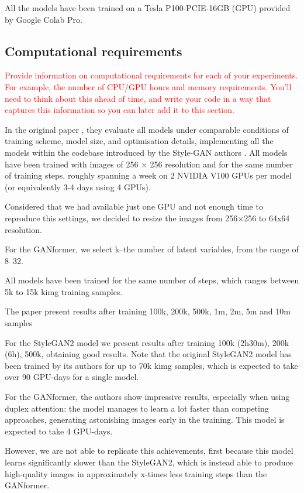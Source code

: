 \documentclass{article}
\begin{document}
	 All the models have been trained on a Tesla P100-PCIE-16GB (GPU) provided by Google 
	 Colab Pro.
	
	\subsection{Computational requirements}
	\textcolor{red}{Provide information on computational requirements for each of your experiments. For 
	example, the  number of CPU/GPU hours and memory requirements. You'll need to think about this 
	ahead of time, and write your code in a way that captures this information so you can later add it to 
	this section.}
	
	In the original paper \cite{hudson2021generative}, they evaluate all models under comparable 
	conditions of training scheme, model size, and optimisation details, implementing all the models 
	within the codebase introduced by the Style-GAN authors \cite{karras2020analyzing}. 
	All models have been trained with images of 256 × 256 resolution and for the 
	same number of training steps, roughly spanning a week on 2 NVIDIA V100 GPUs per model (or 
	equivalently 3-4 days using 4 GPUs). 
	
	Considered that we had available just one GPU and not enough time to reproduce this settings, we 
	decided to resize the images from 256×256 to 64x64 resolution.
	
	
	For the GANformer, we select k–the number of latent variables, from the range of 8–32. 
	
	All models have been trained for the same number of steps, which ranges between 5k to 15k kimg 
	training samples. 
	
	The paper present results after training 100k, 200k, 500k, 1m, 2m, 5m and 10m samples
	
	For the StyleGAN2 model we present results after training 100k (2h30m), 200k (6h), 500k, obtaining 
	good results.
	Note that the original StyleGAN2 model has been trained by its authors \cite{karras2020analyzing} 
	for up to 70k kimg samples, which is expected to take over 90 GPU-days for a single model. 
	

	For the GANformer, the authors \cite{karras2020analyzing} show impressive results, especially when 
	using duplex attention: the model manages to learn a lot faster than competing approaches, 
	generating astonishing images early in the training. This model is expected to take 4 GPU-days.
	
	However, we are not able to replicate this achievements, first because this model learns significantly 
	slower than the StyleGAN2, which is instead able to produce high-quality images in approximately 
	x-times less training steps than the GANformer.
	
\end{document}
